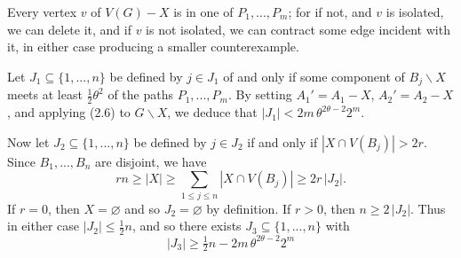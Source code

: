 Every vertex $v$ of $V(G)-X$ is in one of $P_1,..., P_m$; for if not, and $v$ is
isolated, we can delete it, and if $v$ is not isolated, we can contract some edge
incident with it, in either case producing a smaller counterexample.

Let $J_1\subseteq\{1,..., n\}$ be defined by $j\in J_1$ of and only if some component of
$B_j\backslash X$ meets at least $\frac12\theta^2$ of the paths $P_1,..., P_m$. By setting $A_1'=A_1-X$,
$A_2'=A_2-X$, and applying (2.6) to $G\backslash X$, we deduce that $|J_1|<2m\,\theta^{2\theta-2}2^m$.

Now let $J_2\subseteq\{1,..., n\}$ be defined by $j\in J_2$ if and only if $|X\cap V(B_j)|>2r$.
Since $B_1,..., B_n$ are disjoint, we have
\begin{equation*}
rn\ge|X|\ge\sum_{1\le j\le n}|X\cap V(B_j)|\ge 2r\,|J_2|.
\end{equation*}
If $r=0$, then $X=\varnothing$ and so $J_2=\varnothing$ by definition. If $r>0$, then $n\ge 2\,|J_2|$.
Thus in either case $|J_2|\le\frac12 n$, and so there exists $J_3\subseteq\{1,..., n\}$ with
\begin{equation*}
|J_3|\ge\tfrac12 n-2m\,\theta^{2\theta-2}2^m
\end{equation*}
